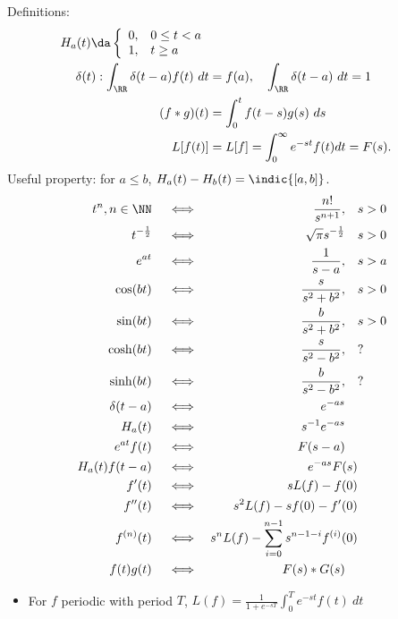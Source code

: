 Definitions:
\begin{align*}
H_ { a } ( t ) \da \left\{ \begin{array} { l l } { 0 , } & { 0 \leq t < a } \\ { 1 , } & { t \geq a } \end{array} \right.\\
\delta(t): \int_\RR \delta(t-a)f(t)~dt &= f(a),\quad \int_\RR \delta(t-a)~dt = 1\\
(f \ast g )(t) &= \int_0^t f(t-s)g(s)~ds \\
L[f(t)] &= L[f] =\int_0^\infty e^{-st}f(t)dt = F(s)
.\end{align*} Useful property: for \(a\leq b\),
\(H_a(t) - H_b(t) = \indic{[a,b]}\).
\begin{align*}
t^n, n\in\NN \quad&\iff  &\frac{n!}{s^{n+1}},\quad &s > 0 \\
t^{-\frac{1}{2}} \quad&\iff &\sqrt{\pi} s^{-\frac{1}{2}}\quad & s>0\\
e^{at} \quad&\iff &\frac{1}{s-a},\quad &s > a \\
\cos(bt) \quad&\iff &\frac{s}{s^2+b^2},\quad &s>0 \\
\sin(bt) \quad&\iff &\frac{b}{s^2+b^2},\quad &s>0 \\
\cosh(bt) \quad&\iff &\frac{s}{s^2 - b^2},\quad &? \\
\sinh(bt) \quad&\iff &\frac{b}{s^2-b^2},\quad &? \\
\delta(t-a) \quad&\iff &e^{-as} \quad& \\
H_a(t) \quad&\iff &s^{-1}e^{-as}\quad& \\
e^{at}f(t) \quad&\iff &F(s-a)\quad & \\
H_a(t)f(t-a) \quad&\iff &e^{-as}F(s)& \\
f'(t) \quad&\iff & sL(f) - f(0) & \\
f''(t) \quad&\iff &s^2L(f) -sf(0) - f'(0) &\\
f^{(n)}(t) \quad&\iff & s^nL(f) - \sum_{i=0}^{n-1} s^{n-1-i}f^{(i)}(0) & \\
f(t)g(t) \quad&\iff &F(s) \ast G(s)\quad &
\end{align*}

\begin{itemize}
\tightlist
\item
  For \(f\) periodic with period \(T\),
  \(L(f) = \frac{1}{1+e^{-sT}}\int_0^T e^{-st}f(t)~dt\)
\end{itemize}

